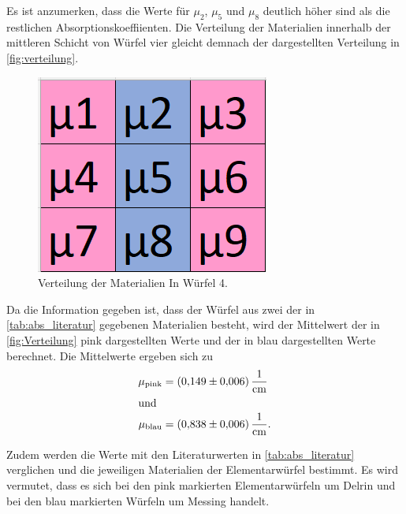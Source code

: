 Es ist anzumerken, dass die Werte für $\mu_2$, $\mu_5$ und $\mu_8$ deutlich höher sind als die restlichen Absorptionskoeffiienten.
Die Verteilung der Materialien innerhalb der mittleren Schicht von Würfel vier gleicht demnach der dargestellten Verteilung in \autoref{fig:verteilung}.
\begin{figure}[H]
  \centering
  \includegraphics[scale=0.7]{Abbildungen/Verteilung.png}
  \caption{Verteilung der Materialien In Würfel 4.}
  \label{fig:Verteilung}
\end{figure}

Da die Information gegeben ist, dass der Würfel aus zwei der in \autoref{tab:abs_literatur} gegebenen Materialien besteht, wird der
Mittelwert der in \autoref{fig:Verteilung} pink dargestellten Werte und der in blau dargestellten Werte berechnet.
Die Mittelwerte ergeben sich zu
\begin{align*}
 \mu_{\mathrm{pink}} &= \qty{0.149 \pm 0.006}{\per\centi\meter} \\
  \shortintertext{und}
 \mu_{\text{blau}} &= \qty{0.838 \pm 0.006}{\per\centi\meter}.
\end{align*}

Zudem werden die Werte mit den Literaturwerten in
\autoref{tab:abs_literatur} verglichen und die jeweiligen Materialien der Elementarwürfel bestimmt.
Es wird vermutet, dass es sich bei den pink markierten Elementarwürfeln um Delrin und bei den blau markierten Würfeln um Messing handelt.